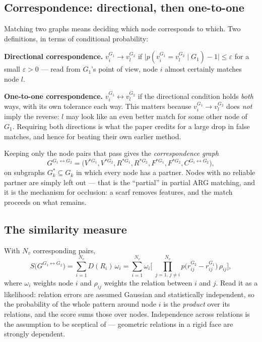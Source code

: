 \documentclass[11pt]{article}
\begin{document}
\subsection{Correspondence: directional, then one-to-one}
Matching two graphs means deciding which node corresponds to which. Two
definitions, in terms of conditional probability:

\textbf{Directional correspondence.} $v_i^{G_1}\!\to v_l^{G_2}$ if
$\bigl|p(v_i^{G_1}\!=v_l^{G_2}\mid G_1)-1\bigr|\le\varepsilon$ for a small
$\varepsilon>0$ --- read from $G_1$'s point of view, node $i$ almost certainly
matches node $l$.

\textbf{One-to-one correspondence.} $v_i^{G_1}\!\leftrightarrow v_l^{G_2}$ if
the directional condition holds \emph{both} ways, with its own tolerance each
way. This matters because $v_i^{G_1}\!\to v_l^{G_2}$ does \emph{not} imply the
reverse: $l$ may look like an even better match for some other node of $G_1$.
Requiring both directions is what the paper credits for a large drop in false
matches, and hence for beating their own earlier method.

Keeping only the node pairs that pass gives the \emph{correspondence graph}
\begin{equation}
G^{G_1\leftrightarrow G_2}=\bigl(V^{*G_1},V^{*G_2},R^{*G_1},R^{*G_2},
F^{*G_1},F^{*G_2},C^{G_1\leftrightarrow G_2}\bigr),
\end{equation}
on subgraphs $G^*_k\subseteq G_k$ in which every node has a partner. Nodes with
no reliable partner are simply left out --- that is the ``partial'' in partial
ARG matching, and it is the mechanism for occlusion: a scarf removes features,
and the match proceeds on what remains.

\subsection{The similarity measure}
With $N_v$ corresponding pairs,
\begin{equation}
S\bigl(G^{G_1\leftrightarrow G_2}\bigr)=\sum_{i=1}^{N_v}D(R_i)\,\omega_i
=\sum_{i=1}^{N_v}\omega_i\Biggl[\;\prod_{j=1,\,j\neq i}^{N_v}
p\bigl(r_{ij}^{G_2}-r_{ij}^{G_1}\bigr)\,\rho_{ij}\Biggr],
\end{equation}
where $\omega_i$ weights node $i$ and $\rho_{ij}$ weights the relation between
$i$ and $j$. Read it as a likelihood: relation errors are assumed Gaussian and
statistically independent, so the probability of the whole pattern around node
$i$ is the \emph{product} over its relations, and the score sums those over
nodes. Independence across relations is the assumption to be sceptical of ---
geometric relations in a rigid face are strongly dependent.
\end{document}
